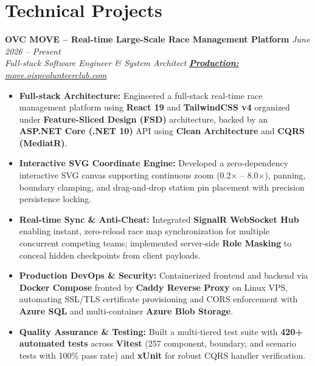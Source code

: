 \documentclass[11pt,a4paper]{article}
\begin{document}
\section*{Technical Projects}
\noindent
\textbf{OVC MOVE -- Real-time Large-Scale Race Management Platform} \hfill \textit{June 2026 -- Present} \\
\textit{Full-stack Software Engineer \& System Architect} \hfill \href{https://move.oispvolunteerclub.com/}{\textit{\textbf{Production:} move.oispvolunteerclub.com}}
\begin{itemize}
    \item \textbf{Full-stack Architecture:} Engineered a full-stack real-time race management platform using \textbf{React 19} and \textbf{TailwindCSS v4} organized under \textbf{Feature-Sliced Design (FSD)} architecture, backed by an \textbf{ASP.NET Core (.NET 10)} API using \textbf{Clean Architecture} and \textbf{CQRS (MediatR)}.
    \item \textbf{Interactive SVG Coordinate Engine:} Developed a zero-dependency interactive SVG canvas supporting continuous zoom (0.2$\times$ -- 8.0$\times$), panning, boundary clamping, and drag-and-drop station pin placement with precision persistence locking.
    \item \textbf{Real-time Sync \& Anti-Cheat:} Integrated \textbf{SignalR WebSocket Hub} enabling instant, zero-reload race map synchronization for multiple concurrent competing teams; implemented server-side \textbf{Role Masking} to conceal hidden checkpoints from client payloads.
    \item \textbf{Production DevOps \& Security:} Containerized frontend and backend via \textbf{Docker Compose} fronted by \textbf{Caddy Reverse Proxy} on Linux VPS, automating SSL/TLS certificate provisioning and CORS enforcement with \textbf{Azure SQL} and multi-container \textbf{Azure Blob Storage}.
    \item \textbf{Quality Assurance \& Testing:} Built a multi-tiered test suite with \textbf{420+ automated tests} across \textbf{Vitest} (257 component, boundary, and scenario tests with 100\% pass rate) and \textbf{xUnit} for robust CQRS handler verification.
\end{itemize}
\end{document}
